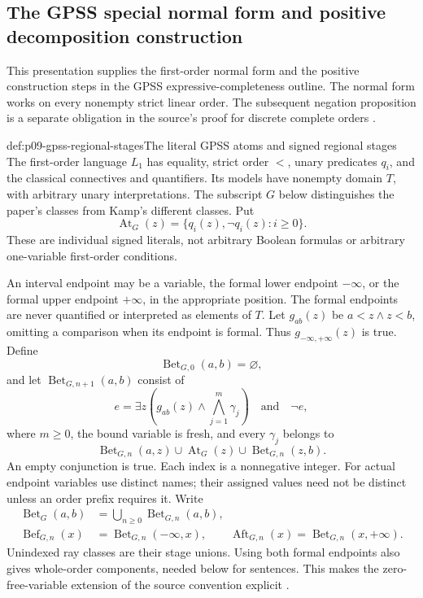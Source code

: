 
\subsection{The GPSS special normal form and positive decomposition construction}
\label{sec:p09-gpss-special-normal-form}

This presentation supplies the first-order normal form and the positive
construction steps in the GPSS expressive-completeness outline. The
normal form works on every nonempty strict linear order. The subsequent
negation proposition is a separate obligation in the source's proof for
discrete complete orders
\cite[pp.~169--171]{GabbayPnueliShelahStavi1980}.

\begin{hbdefinition}{def:p09-gpss-regional-stages}{The literal GPSS atoms and signed regional stages}
The first-order language \(L_1\) has equality, strict order \(<\),
unary predicates \(q_i\), and the classical connectives and quantifiers.
Its models have nonempty domain \(T\), with arbitrary unary
interpretations. The subscript \(G\) below distinguishes the paper's
classes from Kamp's different classes. Put
\[
              \operatorname{At}_G(z)=\{q_i(z),\neg q_i(z):i\geq0\}.
\]
These are individual signed literals, not arbitrary Boolean formulas
or arbitrary one-variable first-order conditions.

An interval endpoint may be a variable, the formal lower endpoint
\(-\infty\), or the formal upper endpoint \(+\infty\), in the
appropriate position. The formal endpoints are never quantified or
interpreted as elements of \(T\). Let \(g_{ab}(z)\) be
\(a<z\land z<b\), omitting a comparison when its endpoint is
formal. Thus \(g_{-\infty,+\infty}(z)\) is true. Define
\[
 \operatorname{Bet}_{G,0}(a,b)=\varnothing,
\]
and let \(\operatorname{Bet}_{G,n+1}(a,b)\) consist of
\[
 e=\exists z\left(g_{ab}(z)\land\bigwedge_{j=1}^{m}\gamma_j\right)
                  \quad\text{and}\quad\neg e,
\]
where \(m\geq0\), the bound variable is fresh, and every
\(\gamma_j\) belongs to
\[
 \operatorname{Bet}_{G,n}(a,z)\cup\operatorname{At}_G(z)
                                  \cup\operatorname{Bet}_{G,n}(z,b).
\]
An empty conjunction is true. Each index is a nonnegative integer.
For actual endpoint variables use distinct names; their assigned values
need not be distinct unless an order prefix requires it. Write
\[
\begin{aligned}
 \operatorname{Bet}_G(a,b)&=\bigcup_{n\geq0}\operatorname{Bet}_{G,n}(a,b),\\
 \operatorname{Bef}_{G,n}(x)&=\operatorname{Bet}_{G,n}(-\infty,x),\qquad
 \operatorname{Aft}_{G,n}(x)=\operatorname{Bet}_{G,n}(x,+\infty).
\end{aligned}
\]
Unindexed ray classes are their stage unions. Using both formal endpoints
also gives whole-order components, needed below for sentences. This makes
the zero-free-variable extension of the source convention explicit
\cite[p.~170]{GabbayPnueliShelahStavi1980}.
\end{hbdefinition}

